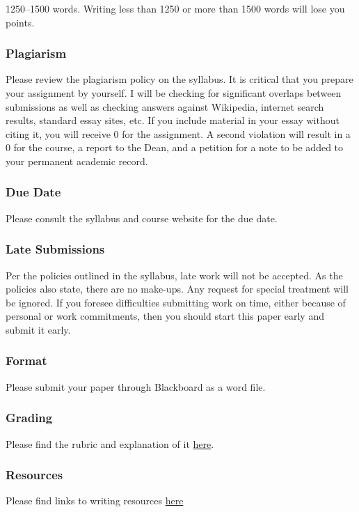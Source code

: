 \documentclass[10pt]{article}
\begin{document}
1250--1500 words. Writing less than 1250 or more than 1500 words will
lose you points.

\subsubsection{Plagiarism}\label{plagiarism}

Please review the plagiarism policy on the syllabus. It is critical that
you prepare your assignment by yourself. I will be checking for
significant overlaps between submissions as well as checking answers
against Wikipedia, internet search results, standard essay sites, etc.
If you include material in your essay without citing it, you will
receive 0 for the assignment. A second violation will result in a 0 for
the course, a report to the Dean, and a petition for a note to be added
to your permanent academic record.

\subsubsection{Due Date}\label{due-date}

Please consult the syllabus and course website for the due date.

\subsubsection{Late Submissions}\label{late-submissions}

Per the policies outlined in the syllabus, late work will not be
accepted. As the policies also state, there are no make-ups. Any request
for special treatment will be ignored. If you foresee difficulties
submitting work on time, either because of personal or work commitments,
then you should start this paper early and submit it early.

\subsubsection{Format}\label{format}

Please submit your paper through Blackboard as a word file.

\subsubsection{Grading}\label{grading}

Please find the rubric and explanation of it
\href{/Teaching/Grading/}{here}.

\subsubsection{Resources}\label{resources}

Please find links to writing resources \href{/Teaching/Resources/}{here}
\end{document}
